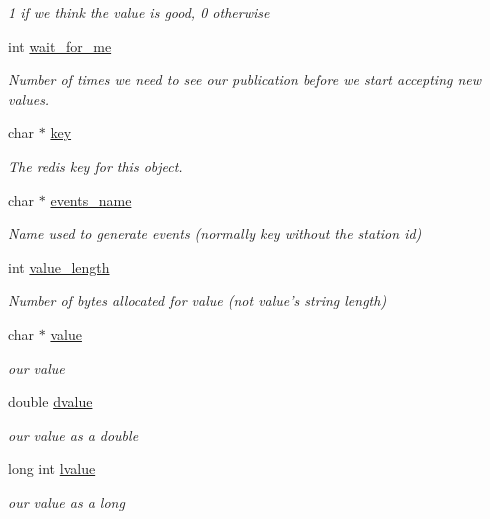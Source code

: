 \begin{DoxyCompactItemize}
\begin{DoxyCompactList}\small\item\em 1 if we think the value is good, 0 otherwise \end{DoxyCompactList}\item 
int \hyperlink{structlsredis__obj__struct_a8bc1a536b7155a1e2a749c7c434b898b}{wait\-\_\-for\-\_\-me}
\begin{DoxyCompactList}\small\item\em Number of times we need to see our publication before we start accepting new values. \end{DoxyCompactList}\item 
char $\ast$ \hyperlink{structlsredis__obj__struct_aa8c5a453b9424e5666320b8675a42f5c}{key}
\begin{DoxyCompactList}\small\item\em The redis key for this object. \end{DoxyCompactList}\item 
char $\ast$ \hyperlink{structlsredis__obj__struct_ad0a987a011b580eab739cda831f78fbb}{events\-\_\-name}
\begin{DoxyCompactList}\small\item\em Name used to generate events (normally key without the station id) \end{DoxyCompactList}\item 
int \hyperlink{structlsredis__obj__struct_a664f0eaafb8dffc0dbde126e0340efb9}{value\-\_\-length}
\begin{DoxyCompactList}\small\item\em Number of bytes allocated for value (not value's string length) \end{DoxyCompactList}\item 
char $\ast$ \hyperlink{structlsredis__obj__struct_a0465c65288e8101805a6f91049164517}{value}
\begin{DoxyCompactList}\small\item\em our value \end{DoxyCompactList}\item 
double \hyperlink{structlsredis__obj__struct_ab60d0a71cabad6b921b6edb5a8f68996}{dvalue}
\begin{DoxyCompactList}\small\item\em our value as a double \end{DoxyCompactList}\item 
long int \hyperlink{structlsredis__obj__struct_a26211a0ab3fc02e7776e24dbc1f1256c}{lvalue}
\begin{DoxyCompactList}\small\item\em our value as a long \end{DoxyCompactList}\item 

\end{DoxyCompactItemize}
